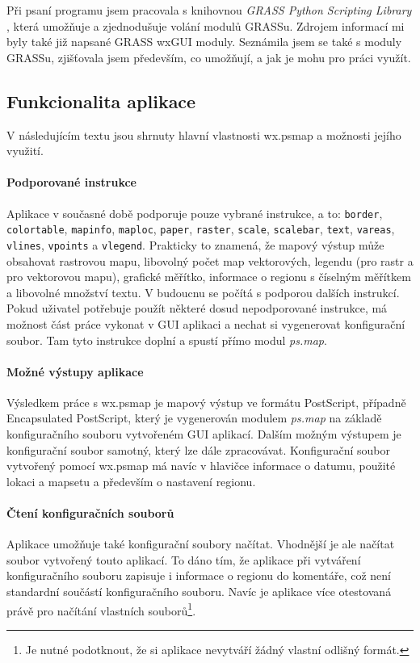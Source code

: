 \documentclass[a4paper,12pt,draft]{article}
\newcommand{\modul}[1]{\emph{#1}}
\newcommand{\instr}[1]{\lstinline[style=psmapInline]|#1|}
\begin{document}
Při psaní programu jsem pracovala s knihovnou \emph{GRASS Python Scripting Library} \cite{script}, která umožňuje a zjednodušuje volání modulů GRASSu. Zdrojem informací mi byly také již napsané GRASS wxGUI moduly. Seznámila jsem se také s moduly GRASSu, zjišťovala jsem především, co umožňují, a jak je mohu pro práci využít. 

\subsection{Funkcionalita aplikace}
V následujícím textu jsou shrnuty hlavní vlastnosti wx.psmap a možnosti jejího využití.

\paragraph*{Podporované instrukce}
    Aplikace v současné době podporuje pouze vybrané instrukce, a to: \instr{border}, \instr{colortable}, \instr{mapinfo}, \instr{maploc}, \instr{paper}, \instr{raster}, \instr{scale}, \instr{scalebar}, \instr{text}, \instr{vareas}, \instr{vlines}, \instr{vpoints} a \instr{vlegend}. Prakticky to znamená, že mapový výstup může obsahovat rastrovou mapu, libovolný počet map vektorových, legendu (pro rastr a pro vektorovou mapu), grafické měřítko, informace o regionu s číselným měřítkem a libovolné množství textu. V budoucnu se počítá s podporou dalších instrukcí. Pokud uživatel potřebuje použít některé dosud nepodporované instrukce, má možnost část práce vykonat v GUI aplikaci a nechat si vygenerovat konfigurační soubor. Tam tyto instrukce doplní a spustí přímo modul \modul{ps.map}.
    
\paragraph*{Možné výstupy aplikace}
Výsledkem práce s wx.psmap je mapový výstup ve formátu PostScript, případně Encapsulated PostScript, který je vygenerován modulem \modul{ps.map} na základě konfiguračního souboru vytvořeném GUI aplikací. Dalším možným výstupem je konfigurační soubor samotný, který lze dále zpracovávat. Konfigurační soubor vytvořený pomocí wx.psmap má navíc v hlavičce informace o datumu, použité lokaci a mapsetu a především o nastavení regionu.

\paragraph*{Čtení konfiguračních souborů}
Aplikace umožňuje také konfigurační soubory načítat. Vhodnější je ale načítat soubor vytvořený touto aplikací. To dáno tím, že aplikace při vytváření konfiguračního souboru zapisuje i informace o regionu do komentáře, což není standardní součástí konfiguračního souboru. Navíc je aplikace více otestovaná právě pro načítání vlastních souborů\footnote{Je nutné podotknout, že si aplikace nevytváří žádný vlastní odlišný formát.}. 
\end{document}
